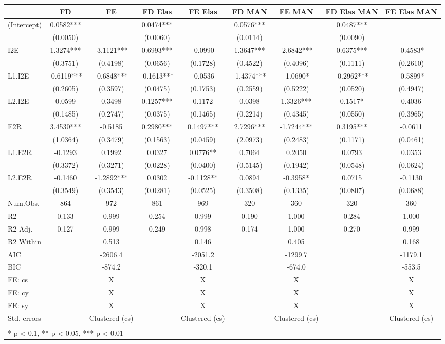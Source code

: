 \begin{table}[H]
\centering
\begin{tabular}[t]{lcccccccc}
\toprule
  & FD & FE & FD Elas & FE Elas & FD MAN & FE MAN & FD Elas MAN & FE Elas MAN\\
\midrule
(Intercept) & 0.0582*** &  & 0.0474*** &  & 0.0576*** &  & 0.0487*** & \\
 & (0.0050) &  & (0.0060) &  & (0.0114) &  & (0.0090) & \\
I2E & 1.3274*** & -3.1121*** & 0.6993*** & -0.0990 & 1.3647*** & -2.6842*** & 0.6375*** & -0.4583*\\
 & (0.3751) & (0.4198) & (0.0656) & (0.1728) & (0.4522) & (0.4096) & (0.1111) & (0.2610)\\
L1.I2E & -0.6119*** & -0.6848*** & -0.1613*** & -0.0536 & -1.4374*** & -1.0690* & -0.2962*** & -0.5899*\\
 & (0.2605) & (0.3597) & (0.0475) & (0.1753) & (0.2559) & (0.5222) & (0.0520) & (0.4947)\\
L2.I2E & 0.0599 & 0.3498 & 0.1257*** & 0.1172 & 0.0398 & 1.3326*** & 0.1517* & 0.4036\\
 & (0.1485) & (0.2747) & (0.0375) & (0.1465) & (0.2214) & (0.4345) & (0.0550) & (0.3965)\\
E2R & 3.4530*** & -0.5185 & 0.2980*** & 0.1497*** & 2.7296*** & -1.7244*** & 0.3195*** & -0.0611\\
 & (1.0364) & (0.3479) & (0.1563) & (0.0459) & (2.0973) & (0.2483) & (0.1171) & (0.0461)\\
L1.E2R & -0.1293 & 0.1992 & 0.0327 & 0.0776** & 0.7064 & 0.2050 & 0.0793 & 0.0353\\
 & (0.3372) & (0.3271) & (0.0228) & (0.0400) & (0.5145) & (0.1942) & (0.0548) & (0.0624)\\
L2.E2R & -0.1460 & -1.2892*** & 0.0302 & -0.1128** & 0.0894 & -0.3958* & 0.0715 & -0.1130\\
 & (0.3549) & (0.3543) & (0.0281) & (0.0525) & (0.3508) & (0.1335) & (0.0807) & (0.0688)\\
\midrule
Num.Obs. & 864 & 972 & 861 & 969 & 320 & 360 & 320 & 360\\
R2 & 0.133 & 0.999 & 0.254 & 0.999 & 0.190 & 1.000 & 0.284 & 1.000\\
R2 Adj. & 0.127 & 0.999 & 0.249 & 0.998 & 0.174 & 1.000 & 0.270 & 0.999\\
R2 Within &  & 0.513 &  & 0.146 &  & 0.405 &  & 0.168\\
AIC &  & -2606.4 &  & -2051.2 &  & -1299.7 &  & -1179.1\\
BIC &  & -874.2 &  & -320.1 &  & -674.0 &  & -553.5\\
FE: cs &  & X &  & X &  & X &  & X\\
FE: cy &  & X &  & X &  & X &  & X\\
FE: sy &  & X &  & X &  & X &  & X\\
Std. errors &  & Clustered (cs) &  & Clustered (cs) &  & Clustered (cs) &  & Clustered (cs)\\
\bottomrule
\multicolumn{9}{l}{\textsuperscript{} * p < 0.1, ** p < 0.05, *** p < 0.01}\\
\end{tabular}
\end{table}
